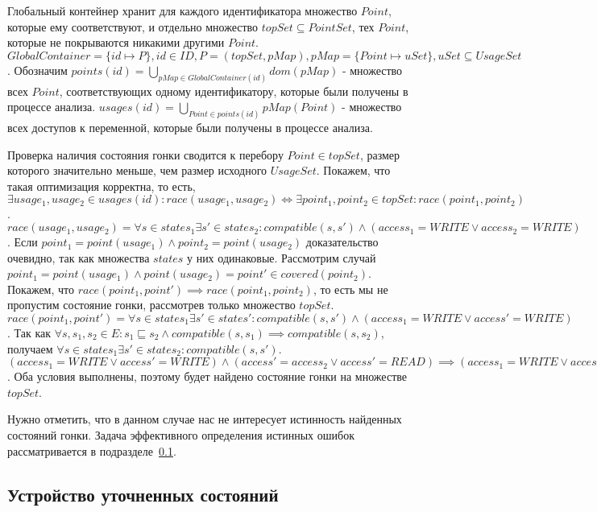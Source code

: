 Глобальный контейнер хранит для каждого идентификатора множество $Point$, которые ему соответствуют, и отдельно множество $topSet \subseteq PointSet$, тех $Point$, которые не покрываются никакими другими $Point$.
$GlobalContainer = \{id \mapsto P\}, id \in ID, P = (topSet, pMap), pMap = \{Point \mapsto uSet\}, uSet \subseteq UsageSet$.
Обозначим $points(id) = \bigcup_{pMap \in GlobalContainer(id)}{dom(pMap)}$ - множество всех $Point$, соответствующих одному идентификатору, которые были получены в процессе анализа.
$usages(id) = \bigcup_{Point \in points(id)}{pMap(Point)}$ - множество всех доступов к переменной, которые были получены в процессе анализа.

Проверка наличия состояния гонки сводится к перебору $Point \in topSet$, размер которого значительно меньше, чем размер исходного $UsageSet$.
Покажем, что такая оптимизация корректна, то есть, 
$\exists usage_1, usage_2 \in usages(id): race(usage_1, usage_2) \Leftrightarrow \exists point_1, point_2 \in topSet: race(point_1, point_2)$.
$race(usage_1, usage_2) = \forall s \in states_1 \exists s' \in states_2: compatible(s, s') \land (access_1 = WRITE \lor access_2 = WRITE)$.
Если $point_1=point(usage_1) \land point_2=point(usage_2)$ доказательство очевидно, так как множества $states$ у них одинаковые.
Рассмотрим случай $point_1 =point(usage_1) \land point(usage_2) = point' \in covered(point_2)$. 
Покажем, что $race(point_1, point') \implies race(point_1, point_2)$, то есть мы не пропустим состояние гонки, рассмотрев только множество $topSet$. 
$race(point_1, point') = \forall s \in states_1 \exists s' \in states': compatible(s, s') \land (access_1 = WRITE \lor access' = WRITE)$.
Так как $\forall s, s_1, s_2 \in E: s_1 \sqsubseteq s_2 \land compatible(s, s_1) \implies compatible(s, s_2)$, получаем $\forall s \in states_1 \exists s' \in states_2: compatible(s, s')$.
$(access_1 = WRITE \lor access' = WRITE) \land (access' = access_2 \lor access' = READ) \implies (access_1 = WRITE \lor access_2 = WRITE)$.
Оба условия выполнены, поэтому будет найдено состояние гонки на множестве $topSet$. 

Нужно отметить, что в данном случае нас не интересует истинность найденных состояний гонки.
Задача эффективного определения истинных ошибок рассматривается в подразделе~\ref{subsect_impl_refined_usages}.

\subsection{Устройство уточненных состояний} \label{subsect_impl_refined_usages}

